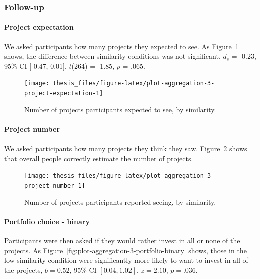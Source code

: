 \documentclass[a4paper, nobind, dvipsnames]{templates/ociamthesis}
\theoremstyle{definition}
\theoremstyle{definition}
\theoremstyle{definition}
\theoremstyle{definition}
\theoremstyle{remark}
\begin{document}
\hypertarget{follow-up-2}{%
\subsubsection{Follow-up}\label{follow-up-2}}

\hypertarget{project-expectation}{%
\paragraph{Project expectation}\label{project-expectation}}

We asked participants how many projects they expected to see. As
Figure~\ref{fig:plot-aggregation-3-project-expectation} shows, the difference
between similarity conditions was not significant,
\(d_s\) = -0.23, 95\% CI {[}-0.47, 0.01{]}, \(t\)(264) = -1.85, \(p\) = .065.



\begin{figure}
\texttt{[image: thesis\_files/figure-latex/plot-aggregation-3-project-expectation-1]} \caption{Number of projects participants expected to see, by similarity.}\label{fig:plot-aggregation-3-project-expectation}
\end{figure}

\hypertarget{project-number-1}{%
\paragraph{Project number}\label{project-number-1}}

We asked participants how many projects they think they saw.
Figure~\ref{fig:plot-aggregation-3-project-number} shows that overall people
correctly estimate the number of projects.



\begin{figure}
\texttt{[image: thesis\_files/figure-latex/plot-aggregation-3-project-number-1]} \caption{Number of projects participants reported seeing, by similarity.}\label{fig:plot-aggregation-3-project-number}
\end{figure}

\hypertarget{portfolio-choice---binary-1}{%
\paragraph{Portfolio choice - binary}\label{portfolio-choice---binary-1}}

Participants were then asked if they would rather invest in all or none of the
projects. As Figure~\ref{fig:plot-aggregation-3-portfolio-binary} shows, those
in the low similarity condition were significantly more likely to want to invest
in all of the projects,
\(b = 0.52\), 95\% CI \([0.04, 1.02]\), \(z = 2.10\), \(p = .036\).
\end{document}
